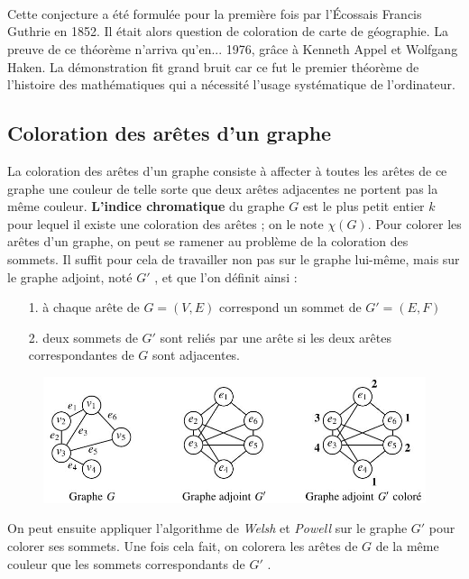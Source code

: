 \paragraph*{$\ \ $}
\noindent Cette conjecture a été formulée pour la première fois par l'Écossais Francis Guthrie en 1852.
Il était alors question de coloration de carte de géographie. La preuve
de ce théorème n'arriva qu'en... 1976, grâce à Kenneth Appel et Wolfgang Haken. La démonstration
 fit grand bruit car ce fut le premier théorème de l'histoire des mathématiques
qui a nécessité l'usage systématique de l'ordinateur.

\subsection*{Coloration des arêtes d'un graphe}
\noindent La coloration des arêtes d'un graphe consiste à affecter à toutes les arêtes de ce graphe une
couleur de telle sorte que deux arêtes adjacentes ne portent pas la même couleur.
\textbf{L'indice chromatique} du graphe $ G $ est le plus petit entier $ k $ pour lequel il existe une
coloration des arêtes ; on le note $ \chi (G) $.
Pour colorer les arêtes d'un graphe, on peut se ramener au problème de la coloration des
sommets. Il suffit pour cela de travailler non pas sur le graphe lui-même, mais sur le graphe
adjoint, noté $ G' $ , et que l'on définit ainsi :
\begin{itemize}
	\item[1.] à chaque arête de $ G = (V, E) $ correspond un sommet de $ G' = (E, F) $
	\item[2.] deux sommets de $ G' $ sont reliés par une arête si les deux arêtes correspondantes de $ G $
sont adjacentes.
\end{itemize}

\begin{figure}[h]
\centering
\includegraphics[width=\linewidth]{images/graph20}
\end{figure}

On peut ensuite appliquer l'algorithme de \emph{Welsh} et \emph{Powell} sur le graphe $ G' $ pour colorer
ses sommets. Une fois cela fait, on colorera les arêtes de $ G $ de la même couleur que les
sommets correspondants de $ G' $ .

